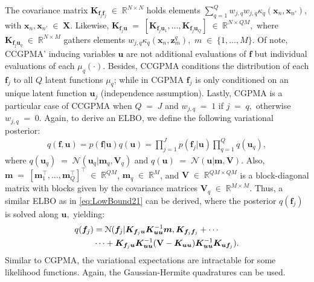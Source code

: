 \documentclass[journal]{IEEEtran}
\providecommand{\ve}[1]{{\bm{#1}}}%
\providecommand{\mat}[1]{{\bm{#1}}} %
\newcommand{\Real}{\mathbb{R}}
\DeclareMathOperator{\en}{\!\,\in\!\,}
\DeclareMathOperator{\igual}{\!\,=\!\,}
\providecommand{\ve}[1]{{\mathbf{#1}}}
\providecommand{\mat}[1]{{\mathbf{#1}}}
\newcommand{\boldV}{\mathbf{V}}
\newcommand{\gauss}{\mathcal{N}} %
\begin{document}
The covariance matrix $\mat{K}_{\ve{f}_j\ve{f}_j}\en \Real^{N\times N}$ 
holds elements $\sum_{q=1}^{Q}w_{j,q}w_{j,q}{\kappa}_q(\ve{x}_n,\ve{x}_{n'})$, with $\ve{x}_n,\ve{x}_{n'}\en\mat{X}$. Likewise, $\mat{K}_{\ve{f}_j{\ve{u}}}\igual [\mat{K}_{\ve{f}_j\ve{u}_1}, \dots , \mat{K}_{\ve{f}_j\ve{u}_Q}]\en \Real^{N\times QM},$ where $\mat{K}_{\ve{f}_j\ve{u}_q} \en \Real^{N\times M}$ gathers elements $w_{j,q}{\kappa}_q(\ve{x}_n, \ve{z}^q_m),$ $m\en\{1,\dots,M\}.$ Of note, CCGPMA' inducing variables ${\ve{u}}$ are not additional evaluations of ${\ve{f}}$ but individual evaluations of each $\mu_q(\cdot)$. Besides, CCGPMA conditions the distribution of each $\ve{f}_j$ to all $Q$ latent functions $\mu_q$; while in CGPMA $\ve{f}_j$ is only conditioned on an unique latent function $\ve{u}_j$ (independence assumption). Lastly, CGPMA is a particular case of CCGPMA when $Q\igual J$ and $w_{j,q}\igual 1$ if $j\igual q,$ otherwise $w_{j,q}\igual 0.$ Again, to derive an ELBO, we define the following variational posterior:
\begin{align}
q({\ve{f}}, {\ve{u}}) = p({\ve{f}}|{\ve{u}})q({\ve{u}})= \prod_{j=1}^{J}p(\ve{f}_j|{\ve{u}})\prod_{q=1}^{Q}q(\ve{u}_q),
\end{align}
where $q(\ve{u}_q)\igual\gauss(\ve{u}_q|\ve{m}_q,\mat{V}_q)$ and $q({\ve{u}})\igual \gauss({\ve{u}}|\ve{m},\mat{V})$.  Also, $\ve{m} \igual [\ve{m}_1^{\top}, \dots , \ve{m}_Q^{\top}]^{\top}\en \Real^{QM}$, $\ve{m}_q\en\Real^{M}$, and $\mat{V}\en \Real^{QM\times QM}$ is a block-diagonal matrix with blocks given by the covariance matrices $\mat{V}_q\en \Real^{M\times M}$. Thus, a similar ELBO as in \cref{eq:LowBound21} can be derived, where the posterior $q(\ve{f}_j)$ is solved along ${\ve{u}},$ yielding:
\begin{align}
\notag q(\ve{f}_j) &=\gauss(\ve{f}_j|\mat{K}_{\ve{f}_j\ve{u}}\mat{K}_{\ve{u}\ve{u}}^{-1}\ve{m}, \mat{K}_{\ve{f}_j\ve{f}_j}+\cdots\\
& \cdots + \mat{K}_{\ve{f}_j\ve{u}}\mat{K}_{\ve{u}\ve{u}}^{-1}(\boldV-\mat{K}_{\ve{u}\ve{u}})\mat{K}_{\ve{u}\ve{u}}^{-1}\mat{K}_{\ve{u}\ve{f}_j}).
\end{align}
Similar to CGPMA, the variational expectations are intractable for some likelihood functions. Again, the Gaussian-Hermite quadratures can be used.
\end{document}
